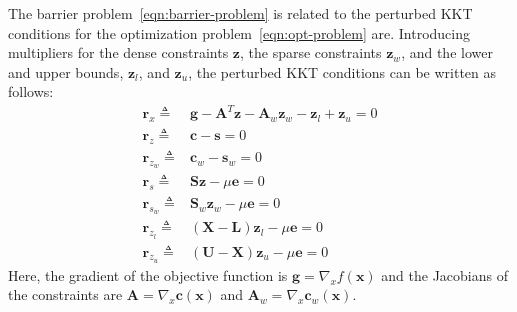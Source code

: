 \documentclass[12pt]{article}
\newcommand{\mb}{\mathbf}
\begin{document}
The barrier problem~\eqref{eqn:barrier-problem} is related to the perturbed KKT conditions for the optimization problem~\eqref{eqn:opt-problem} are.
Introducing multipliers for the dense constraints $\mb{z}$, the sparse constraints $\mb{z}_{w}$, and the lower and upper bounds, $\mb{z}_{l}$, and $\mb{z}_{u}$, the perturbed KKT conditions can be written as follows:
%
\begin{equation}
  \label{eqn:perturbed-kkt}
  \begin{aligned}
    \mb{r}_{x} \triangleq    & \mb{g} - \mb{A}^{T}\mb{z} - \mb{A}_{w} \mb{z}_{w} - \mb{z}_{l} + \mb{z}_{u} = 0 \\
    \mb{r}_{z} \triangleq    & \mb{c} - \mb{s} = 0 \\
    \mb{r}_{z_{w}} \triangleq & \mb{c}_{w} - \mb{s}_{w} = 0 \\
    \mb{r}_{s} \triangleq    & \mb{S} \mb{z} - \mu \mb{e} = 0 \\
    \mb{r}_{s_{w}} \triangleq & \mb{S}_{w} \mb{z}_{w} - \mu \mb{e} = 0\\
    \mb{r}_{z_{l}} \triangleq & (\mb{X} - \mb{L})\mb{z}_{l} - \mu \mb{e} = 0\\
    \mb{r}_{z_{u}} \triangleq & (\mb{U} - \mb{X})\mb{z}_{u} - \mu \mb{e} = 0
  \end{aligned}
\end{equation}
Here, the gradient of the objective function is $\mb{g} = \nabla_{x} f(\mb{x})$ and the Jacobians of the constraints are $\mb{A} = \nabla_{x} \mb{c}(\mb{x})$ and $\mb{A}_{w} = \nabla_{x} \mb{c}_{w}(\mb{x})$.
\end{document}
